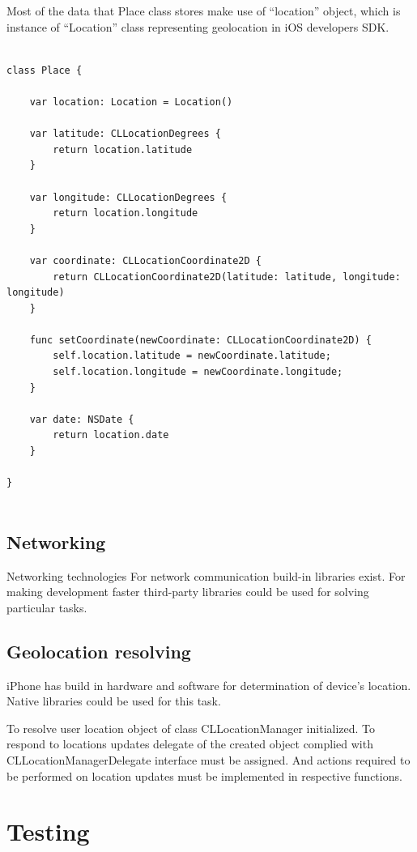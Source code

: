 \documentclass[thesis=M,english]{FITthesis}[2012/10/20]
\begin{document}
Most of the data that Place class stores make use of “location” object, which is instance of “Location” class representing geolocation in iOS developers SDK.


\begin{lstlisting}

class Place {
    
    var location: Location = Location()
    
    var latitude: CLLocationDegrees {
        return location.latitude
    }

    var longitude: CLLocationDegrees {
        return location.longitude
    }

    var coordinate: CLLocationCoordinate2D {
        return CLLocationCoordinate2D(latitude: latitude, longitude: longitude)
    }

    func setCoordinate(newCoordinate: CLLocationCoordinate2D) {
        self.location.latitude = newCoordinate.latitude;
        self.location.longitude = newCoordinate.longitude;
    }      

    var date: NSDate {
        return location.date
    }

}


\end{lstlisting}


\section{Networking}

Networking technologies
For network communication build-in libraries exist. For making development faster third-party libraries could be used for solving particular tasks. 

\section{Geolocation resolving}
iPhone has build in hardware and software for determination of device's location. Native libraries could be used for this task.

To resolve user location object of class CLLocationManager initialized. To respond to locations updates delegate of the created object complied with CLLocationManagerDelegate interface must be assigned. And actions required to be performed on location updates must be implemented in respective functions.



\chapter{Testing}
\end{document}
